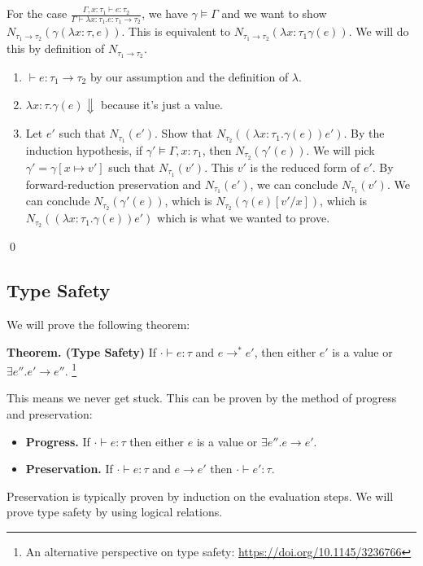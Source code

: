 For the case $\frac{\Gamma, x : \tau_1 \vdash e : \tau_2}{\Gamma \vdash \lambda x: \tau_1. e: \tau_1 \to \tau_2}$,
we have $\gamma \models \Gamma$ and we want to show $N_{\tau_1 \to \tau_2} (\gamma(\lambda x: \tau, e))$.
This is equivalent to $N_{\tau_1 \to \tau_2}(\lambda x: \tau_1 \gamma(e))$.
We will do this by definition of $N_{\tau_1 \to \tau_2}$.
\begin{enumerate}
\item $\vdash e: \tau_1 \to \tau_2$ by our assumption and the definition of $\lambda$.
\item $\lambda x: \tau. \gamma(e) \Downarrow$ because it's just a value.
\item Let $e'$ such that $N_{\tau_1}(e')$. Show that $N_{\tau_2}((\lambda x: \tau_1. \gamma(e)) e')$.
By the induction hypothesis, if $\gamma' \models \Gamma, x: \tau_1$, then $N_{\tau_2}(\gamma'(e))$.
We will pick $\gamma' = \gamma[x\mapsto v']$ such that $N_{\tau_1} (v')$. This $v'$ is the 
reduced form of $e'$. By forward-reduction preservation and $N_{\tau_1}(e')$, we can conclude 
$N_{\tau_1}(v')$. We can conclude $N_{\tau_2}(\gamma'(e))$, which is $N_{\tau_2}(\gamma(e)[v'/x])$,
which is $N_{\tau_2}((\lambda x: \tau_1. \gamma(e)) e')$ which is what we wanted to prove.
\end{enumerate}
\qed

\subsection{Type Safety}
We will prove the following theorem:

\textbf{Theorem. (Type Safety)} If $\cdot \vdash e: \tau$ and $e\to^* e'$, then either
$e'$ is a value or $\exists e''. e' \to e''$. \footnote{An alternative perspective on type safety: 
\href{https://doi.org/10.1145/3236766}{https://doi.org/10.1145/3236766}}

This means we never get stuck. This can be proven by the method of progress and preservation:

\begin{itemize}
\item \textbf{Progress.} If $\cdot \vdash e: \tau$ then either $e$ is a value or $\exists e''. e \to e'$.
\item \textbf{Preservation.} If $\cdot \vdash e : \tau$ and $e \to e'$ then $\cdot \vdash e' : \tau$.
\end{itemize}

Preservation is typically proven by induction on the evaluation steps. We will prove type safety
by using logical relations. %


